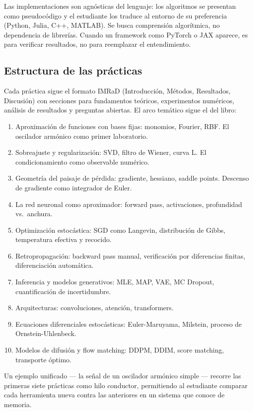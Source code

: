 Las implementaciones son agnósticas del lenguaje: los algoritmos se
presentan como pseudocódigo y el estudiante los traduce al entorno de su
preferencia (Python, Julia, C++, MATLAB). Se busca comprensión
algorítmica, no dependencia de librerías. Cuando un framework como
PyTorch o JAX aparece, es para verificar resultados, no para reemplazar
el entendimiento.

\subsection*{Estructura de las prácticas}

Cada práctica sigue el formato IMRaD (Introducción, Métodos, Resultados,
Discusión) con secciones para fundamentos teóricos, experimentos numéricos,
análisis de resultados y preguntas abiertas. El arco temático sigue el
del libro:

\begin{enumerate}
  \item Aproximación de funciones con bases fijas: monomios, Fourier, RBF.
        El oscilador armónico como primer laboratorio.
  \item Sobreajuste y regularización: SVD, filtro de Wiener, curva L.
        El condicionamiento como observable numérico.
  \item Geometría del paisaje de pérdida: gradiente, hessiano, saddle points.
        Descenso de gradiente como integrador de Euler.
  \item La red neuronal como aproximador: forward pass, activaciones,
        profundidad vs.\ anchura.
  \item Optimización estocástica: SGD como Langevin, distribución de Gibbs,
        temperatura efectiva y recocido.
  \item Retropropagación: backward pass manual, verificación por diferencias
        finitas, diferenciación automática.
  \item Inferencia y modelos generativos: MLE, MAP, VAE, MC Dropout,
        cuantificación de incertidumbre.
  \item Arquitecturas: convoluciones, atención, transformers.
  \item Ecuaciones diferenciales estocásticas: Euler-Maruyama, Milstein,
        proceso de Ornstein-Uhlenbeck.
  \item Modelos de difusión y flow matching: DDPM, DDIM, score matching,
        transporte óptimo.
\end{enumerate}

Un ejemplo unificado --- la señal de un oscilador armónico simple ---
recorre las primeras siete prácticas como hilo conductor, permitiendo
al estudiante comparar cada herramienta nueva contra las anteriores en
un sistema que conoce de memoria.

